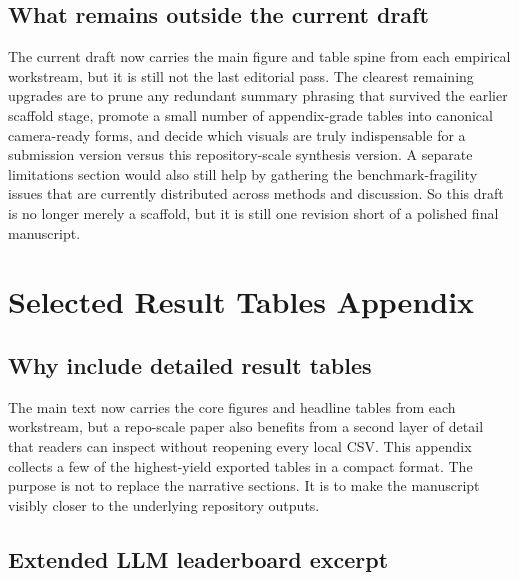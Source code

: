 \documentclass[11pt,letterpaper]{article}
\begin{document}
\subsection{What remains outside the current draft}

The current draft now carries the main figure and table spine from each empirical workstream, but it is still not the last editorial pass. The clearest remaining upgrades are to prune any redundant summary phrasing that survived the earlier scaffold stage, promote a small number of appendix-grade tables into canonical camera-ready forms, and decide which visuals are truly indispensable for a submission version versus this repository-scale synthesis version. A separate limitations section would also still help by gathering the benchmark-fragility issues that are currently distributed across methods and discussion. So this draft is no longer merely a scaffold, but it is still one revision short of a polished final manuscript.

\section{Selected Result Tables Appendix}

\subsection{Why include detailed result tables}

The main text now carries the core figures and headline tables from each workstream, but a repo-scale paper also benefits from a second layer of detail that readers can inspect without reopening every local CSV. This appendix collects a few of the highest-yield exported tables in a compact format. The purpose is not to replace the narrative sections. It is to make the manuscript visibly closer to the underlying repository outputs.

\subsection{Extended LLM leaderboard excerpt}
\end{document}

